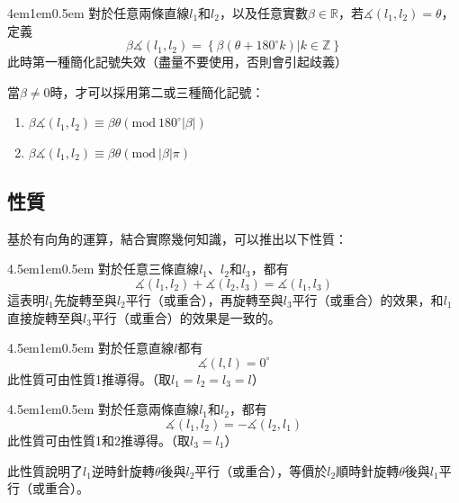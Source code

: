 \documentclass[12pt]{article}
\begin{document}
\begin{mybox}[乘法]{4em}{1em}{0.5em}
    對於任意兩條直線$l_1$和$l_2$，以及任意實數$\beta\in\mathbb{R}$，若$\measuredangle{\left(l_1,l_2\right)}=\theta$，定義
    $$
        \beta\measuredangle{\left(l_1,l_2\right)}=\left\{\beta\left(\theta+180^{\circ}k\right)\left|k\in\mathbb{Z}\right.\right\}
    $$
    此時第一種簡化記號失效（盡量不要使用，否則會引起歧義）

    當$\beta\neq0$時，才可以採用第二或三種簡化記號：
    \begin{enumerate}[start=2]
        \item $\beta\measuredangle{\left(l_1,l_2\right)}\equiv\beta\theta\left(\text{mod}\ {180^{\circ}|\beta|}\right)$
        \item $\beta\measuredangle{\left(l_1,l_2\right)}\equiv\beta\theta\left(\text{mod}\ {|\beta|\pi}\right)$
    \end{enumerate}
\end{mybox}
\subsection{性質}
基於有向角的運算，結合實際幾何知識，可以推出以下性質：
\begin{mybox}[性質1]{4.5em}{1em}{0.5em}
    對於任意三條直線$l_1$、$l_2$和$l_3$，都有
    $$
        \measuredangle{\left(l_1,l_2\right)}+\measuredangle{\left(l_2,l_3\right)}=\measuredangle{\left(l_1,l_3\right)}
    $$
    這表明$l_1$先旋轉至與$l_2$平行（或重合），再旋轉至與$l_3$平行（或重合）的效果，和$l_1$直接旋轉至與$l_3$平行（或重合）的效果是一致的。
\end{mybox}
\begin{mybox}[性質2]{4.5em}{1em}{0.5em}
    對於任意直線$l$都有
    $$
        \measuredangle{\left(l,l\right)}=0^{\circ}
    $$
    此性質可由性質1推導得。（取$l_1=l_2=l_3=l$）
\end{mybox}
\begin{mybox}[性質3]{4.5em}{1em}{0.5em}
    對於任意兩條直線$l_1$和$l_2$，都有
    $$
        \measuredangle{\left(l_1,l_2\right)}=-\measuredangle{\left(l_2,l_1\right)}
    $$
    此性質可由性質1和2推導得。（取$l_3=l_1$）

    此性質說明了$l_1$逆時針旋轉$\theta$後與$l_2$平行（或重合），等價於$l_2$順時針旋轉$\theta$後與$l_1$平行（或重合）。
\end{mybox}
\end{document}
